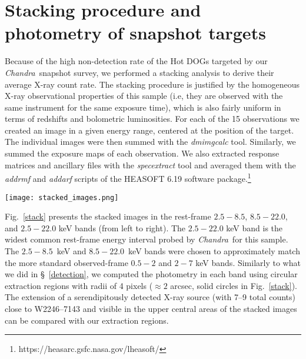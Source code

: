 \documentclass[useAMS,usenatbib]{mnras}
\newcommand*{\chandra}{\textit{Chandra}}
\begin{document}
\section{Stacking procedure and photometry of snapshot targets}\label{stack_sec}
Because of the high non-detection rate of the Hot DOGs targeted by our \chandra\, snapshot survey, we performed a stacking analysis to derive their average X-ray count rate.
The stacking procedure is justified by the homogeneous X-ray observational properties of this sample (i.e, they are observed with the same instrument for the same exposure time), which is also fairly uniform in terms of redshifts and bolometric luminosities.
For each of the 15 observations we created an image in a given energy range, centered at the position of the target. The individual images were then summed with the \textit{dmimgcalc} tool. 
Similarly, we summed the exposure maps of each observation.
We also extracted response matrices and ancillary files with the \textit{specextract} tool and averaged them with the \textit{addrmf} and \textit{addarf} scripts of the HEASOFT 6.19 software package.\footnote{https://heasarc.gsfc.nasa.gov/lheasoft/}


\begin{figure*} 
	\centering
	\texttt{[image: stacked\_images.png]}
	\caption{From left to right: stacked and smoothed X-ray images in the rest-frame $2.5-8.5$, $8.5-22.0$, and $2.5-22.0$ keV bands. Each panel has a dimension of $101\times101$ pixels (about $50\times50$ arcsec). Solid circles have radii of 4 pixels ($\approx2$ arcsec) and represent the extraction regions we used to compute the photometry. The significant emission in the upper central parts of the images (especially in the hard and full bands) is due to a serendipitously detected X-ray source (with 7--9 counts) in the proximity ($\approx16$ arcsec offset) of W2246--7143.}
	\label{stack}
\end{figure*}



Fig.~\ref{stack} presents the stacked images in the rest-frame $2.5-8.5$, $8.5-22.0$, and $2.5-22.0$ keV bands (from left to right). The $2.5-22.0$ keV band is the widest common rest-frame energy interval probed by \chandra\, for this sample. The  $2.5-8.5$~keV and $8.5-22.0$~keV bands were chosen to approximately match the more standard observed-frame $0.5-2$ and $2-7$ keV bands. Similarly to what we did in \S~\ref{detection}, we computed the photometry in each band using circular extraction regions with radii of 4 pixels ($\approx2$ arcsec, solid circles in Fig.~\ref{stack}). 
The extension of a serendipitously detected X-ray source (with 7--9 total counts) close to W2246--7143 and visible in the upper central areas of the stacked images can be compared with our extraction regions. 
\end{document}
